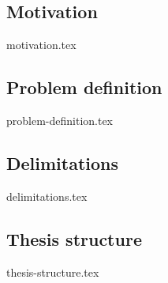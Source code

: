 \subsection{Motivation}
{motivation.tex}

\subsection{Problem definition}
\label{sec:problemdefinition}
{problem-definition.tex}



\subsection{Delimitations}
{delimitations.tex}

\subsection{Thesis structure}
{thesis-structure.tex}

